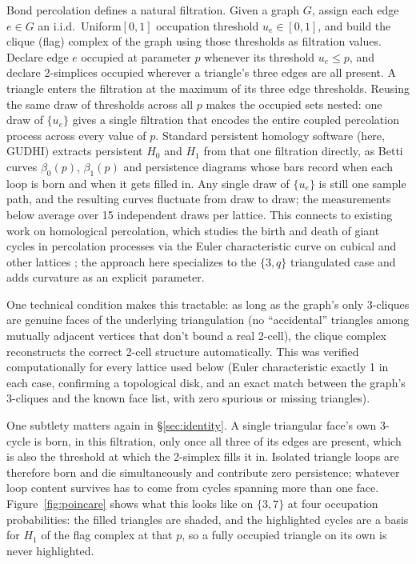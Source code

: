 \documentclass[11pt]{article}
\begin{document}
Bond percolation defines a natural filtration. Given a graph $G$, assign each edge $e\in G$ an i.i.d.\ Uniform$[0,1]$ occupation threshold $u_e\in[0,1]$, and build the clique (flag) complex of the graph using those thresholds as filtration values. Declare edge $e$ occupied at parameter $p$ whenever its threshold $u_e\le p$, and declare 2-simplices occupied wherever a triangle's three edges are all present. A triangle enters the filtration at the maximum of its three edge thresholds. Reusing the same draw of thresholds across all $p$ makes the occupied sets nested: one draw of $\{u_e\}$ gives a single filtration that encodes the entire coupled percolation process across every value of $p$. Standard persistent homology software (here, GUDHI) extracts persistent $H_0$ and $H_1$ from that one filtration directly, as Betti curves $\beta_0(p)$, $\beta_1(p)$ and persistence diagrams whose bars record when each loop is born and when it gets filled in. Any single draw of $\{u_e\}$ is still one sample path, and the resulting curves fluctuate from draw to draw; the measurements below average over 15 independent draws per lattice. This connects to existing work on homological percolation, which studies the birth and death of giant cycles in percolation processes via the Euler characteristic curve on cubical and other lattices \citep{bobrowski2020}; the approach here specializes to the $\{3,q\}$ triangulated case and adds curvature as an explicit parameter.

One technical condition makes this tractable: as long as the graph's only 3-cliques are genuine faces of the underlying triangulation (no ``accidental'' triangles among mutually adjacent vertices that don't bound a real 2-cell), the clique complex reconstructs the correct 2-cell structure automatically. This was verified computationally for every lattice used below (Euler characteristic exactly 1 in each case, confirming a topological disk, and an exact match between the graph's 3-cliques and the known face list, with zero spurious or missing triangles).

One subtlety matters again in \S\ref{sec:identity}. A single triangular face's own 3-cycle is born, in this filtration, only once all three of its edges are present, which is also the threshold at which the 2-simplex fills it in. Isolated triangle loops are therefore born and die simultaneously and contribute zero persistence; whatever loop content survives has to come from cycles spanning more than one face. Figure~\ref{fig:poincare} shows what this looks like on $\{3,7\}$ at four occupation probabilities: the filled triangles are shaded, and the highlighted cycles are a basis for $H_1$ of the flag complex at that $p$, so a fully occupied triangle on its own is never highlighted.
\end{document}
